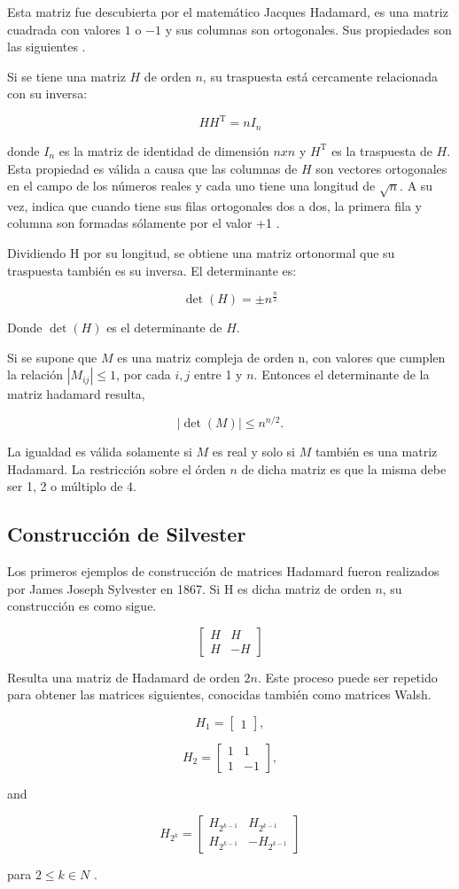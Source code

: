 Esta matriz fue descubierta por el matemático Jacques Hadamard, es una matriz cuadrada con valores $1$ o $-1$ y sus columnas 
son ortogonales. Sus propiedades son las siguientes \cite{Seberry2005}. 

Si se tiene una matriz $H$ de orden $n$, su traspuesta está cercamente relacionada con su inversa:

$$ H H^{\mathrm{T}} = n I_n $$

donde $I_n$ es la matriz de identidad de dimensión $n x n$ y $H^\mathrm{T}$ es la traspuesta de $H$. Esta propiedad es válida a causa 
que las columnas de $H$ son vectores ortogonales en el campo de los números reales y cada uno tiene una longitud de $\sqrt n$. A
su vez, indica que cuando tiene sus filas ortogonales dos a dos, la primera fila y columna son formadas sólamente por el valor +1
\cite{Armario}.

Dividiendo H por su longitud, se obtiene una matriz ortonormal que su traspuesta también es su inversa. El determinante es:

$$ \operatorname{det}(H) = \pm n^{\frac{n}{2}} $$

Donde $\operatorname{det}(H)$ es el determinante de $H$.

Si se supone que $M$ es una matriz compleja de orden n, con valores que cumplen la relación $|M_{ij}| \le 1$, por cada $i,j$ 
entre 1 y $n$. Entonces el determinante de la matriz hadamard resulta,
		    
$$ |\operatorname{det}(M)| \leq n^{n/2}. $$

La igualdad es válida solamente si $M$ es real y solo si $M$ también es una matriz Hadamard. La restricción sobre el órden
$n$ de dicha matriz es que la misma debe ser 1, 2 o múltiplo de 4.


\subsection{Construcción de Silvester}

Los primeros ejemplos de construcción de matrices Hadamard fueron realizados por James Joseph Sylvester en 1867. Si H es 
dicha matriz de orden $n$, su construcción es como sigue.

$$ \begin{bmatrix} H & H\\H & -H\end{bmatrix} $$

Resulta una matriz de Hadamard de orden $2n$. Este proceso puede ser repetido para obtener las matrices siguientes, 
conocidas también como matrices Walsh. 

$$ H_1 = \begin{bmatrix} 1 \end{bmatrix}, $$

$$  H_2 = \begin{bmatrix} 1 & 1 \\ 1 & -1 \end{bmatrix}, $$

and

$$ H_{2^k} = \begin{bmatrix} H_{2^{k-1}} & H_{2^{k-1}}\\ H_{2^{k-1}} & -H_{2^{k-1}}\end{bmatrix} $$

para $2 \le k \in N$ \cite{Singhal2012}.
